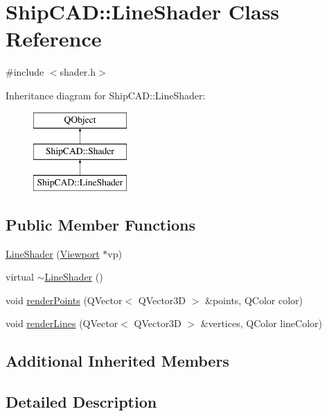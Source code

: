 \hypertarget{classShipCAD_1_1LineShader}{\section{Ship\-C\-A\-D\-:\-:Line\-Shader Class Reference}
\label{classShipCAD_1_1LineShader}
}


{\ttfamily \#include $<$shader.\-h$>$}

Inheritance diagram for Ship\-C\-A\-D\-:\-:Line\-Shader\-:\begin{figure}[H]
\begin{center}
\leavevmode
\includegraphics[height=3.000000cm]{classShipCAD_1_1LineShader}
\end{center}
\end{figure}
\subsection*{Public Member Functions}
\begin{DoxyCompactItemize}
\item 
\hyperlink{classShipCAD_1_1LineShader_ae06ecf68dfc054511db3937893850d2f}{Line\-Shader} (\hyperlink{classShipCAD_1_1Viewport}{Viewport} $\ast$vp)
\item 
virtual \hyperlink{classShipCAD_1_1LineShader_ae5c2761813aac4839a5b31648e37d343}{$\sim$\-Line\-Shader} ()
\item 
void \hyperlink{classShipCAD_1_1LineShader_aaa105117e559ec413a733e14dc638b5a}{render\-Points} (Q\-Vector$<$ Q\-Vector3\-D $>$ \&points, Q\-Color color)
\item 
void \hyperlink{classShipCAD_1_1LineShader_a3d30bda1883e0eda65ea23c4da76f610}{render\-Lines} (Q\-Vector$<$ Q\-Vector3\-D $>$ \&vertices, Q\-Color line\-Color)
\end{DoxyCompactItemize}
\subsection*{Additional Inherited Members}


\subsection{Detailed Description}


